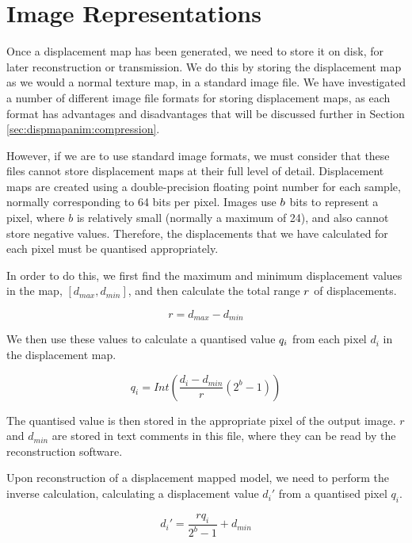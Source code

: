 \section{\label{sec:dispmapanim:representation}Image Representations}

Once a displacement map has been generated, we need to store it on disk, for later reconstruction or transmission. We do this by storing the displacement map as we would a normal texture map, in a standard image file. We have investigated a number of different image file formats for storing displacement maps, as each format has advantages and disadvantages that will be discussed further in Section \ref{sec:dispmapanim:compression}.

However, if we are to use standard image formats, we must consider that these files cannot store displacement maps at their full level of detail. Displacement maps are created using a double-precision floating point number for each sample, normally corresponding to 64 bits per pixel. Images use $b\symbol{bits}$ bits to represent a pixel, where $b$ is relatively small (normally a maximum of 24), and also cannot store negative values. Therefore, the displacements that we have calculated for each pixel must be quantised appropriately.

In order to do this, we first find the maximum and minimum displacement values in the map, $[d_{max}, d_{min}]$, and then calculate the total range $r\symbol{range}$ of displacements.

\begin{equation}\label{eqn:range}
r = d_{max} - d_{min}
\end{equation}

We then use these values to calculate a quantised value $q_i\symbol{quantpixel}$ from each pixel $d_i$ in the displacement map.

\begin{equation}\label{eqn:quantise}
q_i = Int(\frac{d_i - d_{min}}r  (2^b-1))
\end{equation}

The quantised value is then stored in the appropriate pixel of the output image. $r$ and $d_{min}$ are stored in text comments in this file, where they can be read by the reconstruction software. 

Upon reconstruction of a displacement mapped model, we need to perform the inverse calculation, calculating a displacement value $d_i'$ from a quantised pixel $q_i$. 

\begin{equation} \label{eqn:recalcdistance}
d_i' = \frac{r q_i}{2^b-1} + d_{min}
\end{equation}

